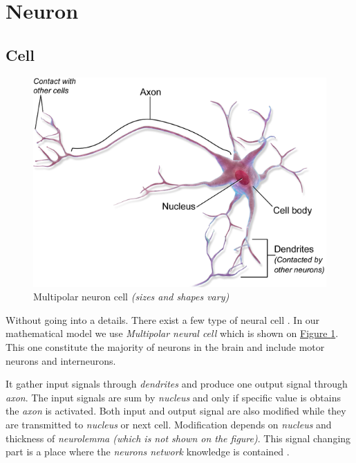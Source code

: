 \section{Neuron}

\subsection{Cell}

\begin{figure}[!h]
    \centering
    \includegraphics[scale=1]{Media/MultipolarNeuron.png}
    \caption[Multipolar neuron cell]{Multipolar neuron cell \textit{(sizes and shapes vary)} \cite{neuronPNG}}
    \label{fig:MultipolarNeuronCell}
\end{figure}

Without going into a details. There exist a few type of neural cell \cite{manyNeuronVersions}. In our mathematical model we use \textit{Multipolar neural cell} which is shown on \hyperref[fig:MultipolarNeuronCell]{Figure \ref{fig:MultipolarNeuronCell}}. This one constitute the majority of neurons in the brain and include motor neurons and interneurons.

It gather input signals through \textit{dendrites} and produce one output signal through \textit{axon}. The input signals are sum by \textit{nucleus} and only if specific value is obtains the \textit{axon} is activated. Both input and output signal are also modified while they are transmitted to \textit{nucleus} or next cell. Modification depends on \textit{nucleus} and thickness of \textit{neurolemma (which is not shown on the figure)}. This signal changing part is a place where the \textit{neurons network} knowledge is contained \cite{mlpPawelRosczak}.

